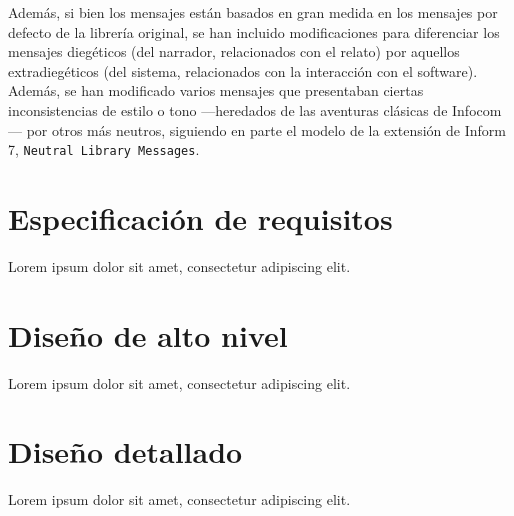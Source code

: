 Además, si bien los mensajes están basados en gran medida en los mensajes por defecto de la librería original, se han incluido modificaciones para diferenciar los mensajes diegéticos (del narrador, relacionados con el relato) por aquellos extradiegéticos (del sistema, relacionados con la interacción con el software). Además, se han modificado varios mensajes que presentaban ciertas inconsistencias de estilo o tono ---heredados de las aventuras clásicas de Infocom--- por otros más neutros, siguiendo en parte el modelo de la extensión de Inform 7, \texttt{Neutral Library Messages}\cite{Reed:2007}.


\section{Especificación de requisitos}

Lorem ipsum dolor sit amet, consectetur adipiscing elit.

\section{Diseño de alto nivel}

Lorem ipsum dolor sit amet, consectetur adipiscing elit.

\section{Diseño detallado}

Lorem ipsum dolor sit amet, consectetur adipiscing elit.
